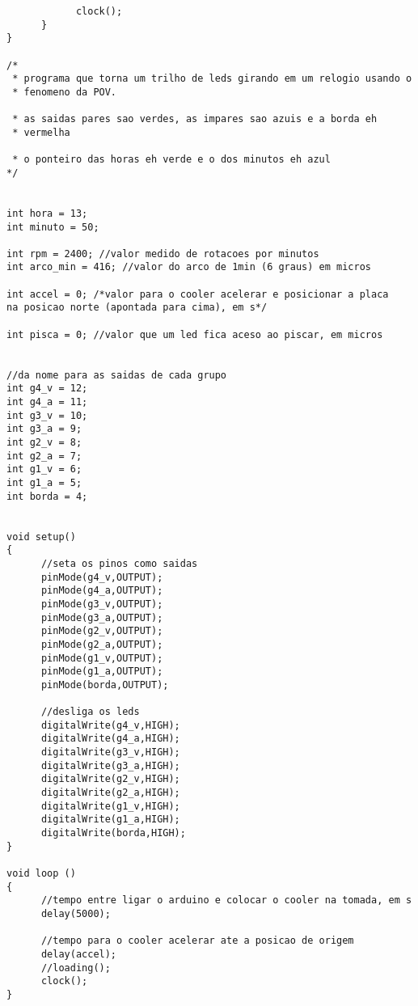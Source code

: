 \begin{lstlisting}
            clock();
      }
}

/*
 * programa que torna um trilho de leds girando em um relogio usando o
 * fenomeno da POV.

 * as saidas pares sao verdes, as impares sao azuis e a borda eh
 * vermelha

 * o ponteiro das horas eh verde e o dos minutos eh azul
*/


int hora = 13;
int minuto = 50;

int rpm = 2400; //valor medido de rotacoes por minutos
int arco_min = 416; //valor do arco de 1min (6 graus) em micros

int accel = 0; /*valor para o cooler acelerar e posicionar a placa
na posicao norte (apontada para cima), em s*/

int pisca = 0; //valor que um led fica aceso ao piscar, em micros


//da nome para as saidas de cada grupo
int g4_v = 12;
int g4_a = 11;
int g3_v = 10;
int g3_a = 9;
int g2_v = 8;
int g2_a = 7;
int g1_v = 6;
int g1_a = 5;
int borda = 4;


void setup()
{
      //seta os pinos como saidas
      pinMode(g4_v,OUTPUT);
      pinMode(g4_a,OUTPUT);
      pinMode(g3_v,OUTPUT);
      pinMode(g3_a,OUTPUT);
      pinMode(g2_v,OUTPUT);
      pinMode(g2_a,OUTPUT);
      pinMode(g1_v,OUTPUT);
      pinMode(g1_a,OUTPUT);
      pinMode(borda,OUTPUT);

      //desliga os leds
      digitalWrite(g4_v,HIGH);
      digitalWrite(g4_a,HIGH);
      digitalWrite(g3_v,HIGH);
      digitalWrite(g3_a,HIGH);
      digitalWrite(g2_v,HIGH);
      digitalWrite(g2_a,HIGH);
      digitalWrite(g1_v,HIGH);
      digitalWrite(g1_a,HIGH);
      digitalWrite(borda,HIGH);
}

void loop ()
{
      //tempo entre ligar o arduino e colocar o cooler na tomada, em s
      delay(5000);

      //tempo para o cooler acelerar ate a posicao de origem
      delay(accel);
      //loading();
      clock();
}
\end{lstlisting} 